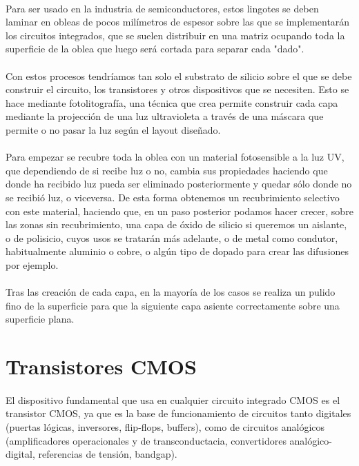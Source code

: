 \paragraph{}
Para ser usado en la industria de semiconductores, estos lingotes se deben laminar
en obleas de pocos milímetros de espesor sobre las que se implementarán los
circuitos integrados, que se suelen distribuir en una matriz ocupando toda la
superficie de la oblea que luego será cortada para separar cada "dado".

\paragraph{}
Con estos procesos tendríamos tan solo el substrato de silicio sobre el que
se debe construir el circuito, los transistores y otros dispositivos que se
necesiten. Esto se hace mediante fotolitografía, una técnica que crea permite
construir cada capa mediante la projección de una luz ultravioleta a través de
una máscara que permite o no pasar la luz según el layout diseñado.

\paragraph{}
Para empezar se recubre toda la oblea con un material fotosensible a la luz UV,
que dependiendo de si recibe luz o no, cambia sus propiedades haciendo que donde
ha recibido luz pueda ser eliminado posteriormente y quedar sólo donde no se recibió
luz, o viceversa. De esta forma obtenemos un recubrimiento selectivo con este
material, haciendo que, en un paso posterior podamos hacer crecer, sobre las zonas
sin recubrimiento, una capa de óxido de silicio si queremos un aislante, o de polisicio,
cuyos usos se tratarán más adelante, o de metal como condutor, habitualmente
aluminio o cobre, o algún tipo de dopado para crear las difusiones por ejemplo.

\paragraph{}
Tras las creación de cada capa, en la mayoría de los casos se realiza un pulido
fino de la superficie para que la siguiente capa asiente correctamente sobre una
superficie plana.

\section{Transistores CMOS}\label{cap:transistor_cmos}
\paragraph{}
El dispositivo fundamental que usa en cualquier circuito integrado CMOS es el
transistor CMOS, ya que es la base de funcionamiento de circuitos tanto digitales
(puertas lógicas, inversores, flip-flops, buffers), como de circuitos analógicos
(amplificadores operacionales y de transconductacia, convertidores analógico-digital,
referencias de tensión, bandgap).

